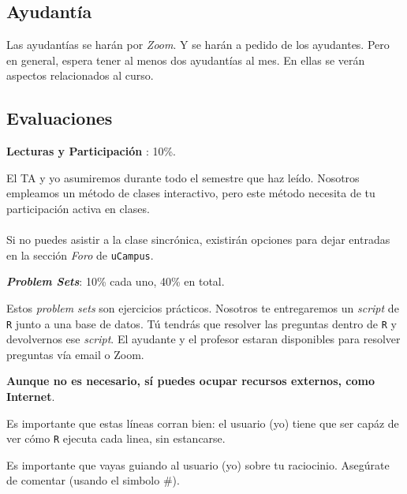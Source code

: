 \documentclass[letterpaper]{article}
\renewenvironment{itemize}{
  \begin{list}{}{
    \setlength{\leftmargin}{1.5em}
  }
}{
  \end{list}
}
\begin{document}
\subsection*{Ayudant\'ia}

Las ayudant\'ias se har\'an por \emph{Zoom}. Y se har\'an a pedido de los ayudantes. Pero en general, espera tener al menos dos ayudant\'ias al mes. En ellas se ver\'an aspectos relacionados al curso.



\subsection*{Evaluaciones}

\begin{enumerate}

	\item {\bf Lecturas y Participaci\'on }: 10\%.
	
    El TA y yo asumiremos durante todo el semestre que haz le\'ido. Nosotros empleamos un m\'etodo de clases interactivo, pero este m\'etodo necesita de tu participaci\'on activa en clases.
    \\
    \\  
    Si no puedes asistir a la clase sincr\'onica, existir\'an opciones para dejar entradas en la secci\'on \emph{Foro} de \texttt{uCampus}.

	\item {\bf \emph{Problem Sets}}: 10\% cada uno, 40\% en total.

Estos \emph{problem sets} son ejercicios pr\'acticos. Nosotros te entregaremos un \emph{script} de \texttt{R} junto a una base de datos. T\'u tendr\'as que resolver las preguntas dentro de \texttt{R} y devolvernos ese \emph{script}. El ayudante y el profesor estaran disponibles para resolver preguntas v\'ia email o Zoom.

\begin{itemize}
		\item[$\diamond$] {\bf Aunque no es necesario, s\'i puedes ocupar recursos externos, como Internet}.
		\item[$\diamond$] Es importante que estas l\'ineas corran bien: el usuario (yo) tiene que ser cap\'az de ver c\'omo \texttt{R} ejecuta cada linea, sin estancarse.
		\item[$\diamond$] Es importante que vayas guiando al usuario (yo) sobre tu raciocinio. Aseg\'urate de comentar (usando el simbolo \#).
\end{itemize}



\end{enumerate}
\end{document}
